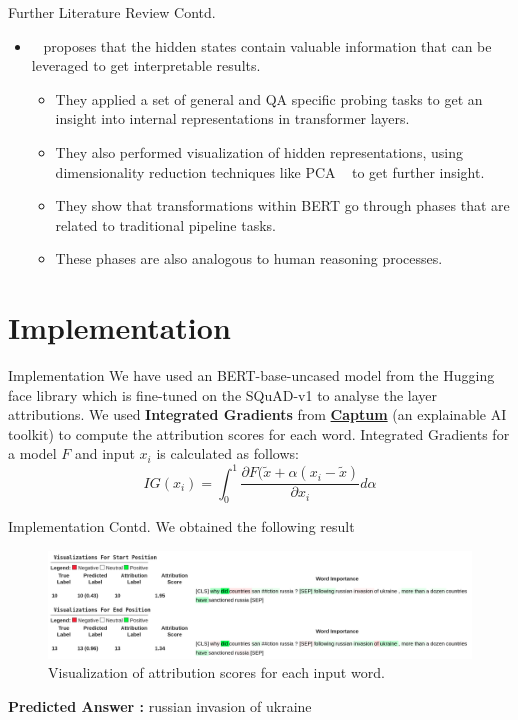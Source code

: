 \documentclass[10pt]{beamer}
\begin{document}
\begin{frame}{Further Literature Review Contd.}
\begin{itemize}
    \item ~\cite{bert_layers_qa} proposes that the hidden states contain valuable information that can be leveraged to get interpretable results.
    \begin{itemize}
        \item They applied a set of general and QA specific probing tasks to get an insight into internal representations in transformer layers. 
        \item They also performed visualization of hidden representations, using dimensionality reduction techniques like PCA ~\cite{PCA} to get further insight.
        \item They show that transformations within BERT go through phases that are related to traditional pipeline tasks. 
        \item These phases are also analogous to human reasoning processes.
    \end{itemize}
\end{itemize}
\end{frame}

\section{Implementation}
\begin{frame}{Implementation}
We have used an BERT-base-uncased model from the Hugging face library which is fine-tuned on the SQuAD-v1 to analyse the layer attributions. We used \textbf{Integrated Gradients} from \href{https://captum.ai/}{\textbf{Captum}} (an explainable AI toolkit) to compute the attribution scores for each word.
Integrated Gradients for a model $F$ and input $x_i$ is calculated as follows:
\begin{equation}
    \displaystyle IG(x_i) = \int_{0}^{1}\frac{\partial F(\tilde{x}+\alpha(x_i - \tilde{x} )}{\partial x_i} d\alpha
\end{equation}
\end{frame}
\begin{frame}{Implementation Contd.}
We obtained the following result
\begin{figure}[h]
    \centering
    \onecolumn\includegraphics[scale=0.2]{1.png}
    \caption{Visualization of attribution scores for each input word.}
    \label{fig:my_label}
\end{figure}


\centerline{\textbf{Predicted Answer :} russian invasion of ukraine}
\end{frame}
\end{document}
